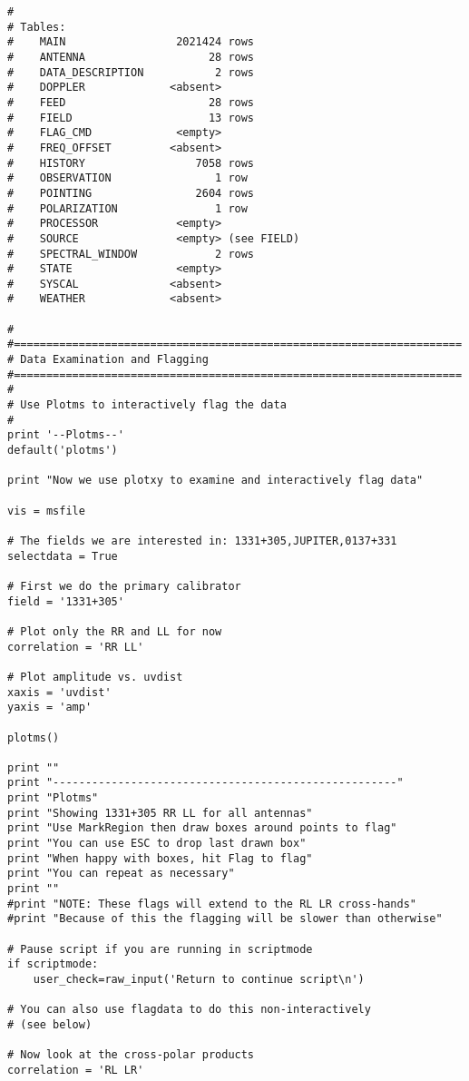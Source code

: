 \begin{verbatim}
# 
# Tables:
#    MAIN                 2021424 rows     
#    ANTENNA                   28 rows     
#    DATA_DESCRIPTION           2 rows     
#    DOPPLER             <absent>  
#    FEED                      28 rows     
#    FIELD                     13 rows     
#    FLAG_CMD             <empty>  
#    FREQ_OFFSET         <absent>  
#    HISTORY                 7058 rows     
#    OBSERVATION                1 row      
#    POINTING                2604 rows     
#    POLARIZATION               1 row      
#    PROCESSOR            <empty>  
#    SOURCE               <empty> (see FIELD)
#    SPECTRAL_WINDOW            2 rows     
#    STATE                <empty>  
#    SYSCAL              <absent>  
#    WEATHER             <absent>  

# 
#=====================================================================
# Data Examination and Flagging
#=====================================================================
# 
# Use Plotms to interactively flag the data
#
print '--Plotms--'
default('plotms')

print "Now we use plotxy to examine and interactively flag data"

vis = msfile

# The fields we are interested in: 1331+305,JUPITER,0137+331
selectdata = True

# First we do the primary calibrator
field = '1331+305'

# Plot only the RR and LL for now
correlation = 'RR LL'

# Plot amplitude vs. uvdist
xaxis = 'uvdist'
yaxis = 'amp'

plotms()

print ""
print "-----------------------------------------------------"
print "Plotms"
print "Showing 1331+305 RR LL for all antennas"
print "Use MarkRegion then draw boxes around points to flag"
print "You can use ESC to drop last drawn box"
print "When happy with boxes, hit Flag to flag"
print "You can repeat as necessary"
print ""
#print "NOTE: These flags will extend to the RL LR cross-hands"
#print "Because of this the flagging will be slower than otherwise"

# Pause script if you are running in scriptmode
if scriptmode:
    user_check=raw_input('Return to continue script\n')

# You can also use flagdata to do this non-interactively
# (see below)

# Now look at the cross-polar products
correlation = 'RL LR'



\end{verbatim}

